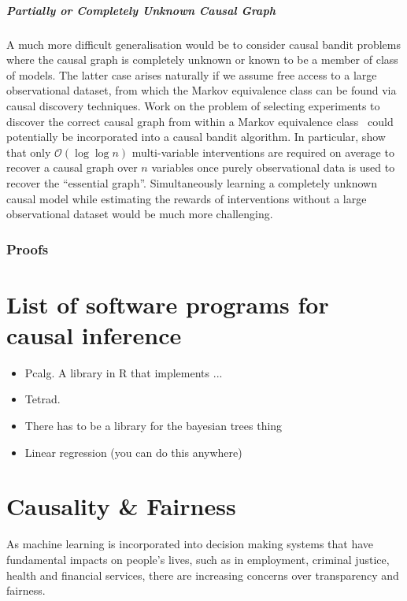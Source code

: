\documentclass[11pt,a4paper,oneside]{book}
\newcommand{\bigo}[1]{\mathcal{O}\left( #1 \right)}
\begin{document}
\paragraph{Partially or Completely Unknown Causal Graph}
A much more difficult generalisation would be to consider causal bandit problems where the causal graph is completely unknown or known to be a member of class of models.
The latter case arises naturally if we assume free access to a large observational dataset, from which the Markov equivalence class can be found via causal discovery techniques. 
Work on the problem of selecting experiments to discover the correct causal graph from within a Markov equivalence class~\cite{Eberhardt2005,eberhardt2010causal,hauser2014two,Hu2014b} could potentially be incorporated into a causal bandit algorithm.
In particular, \citet{Hu2014b} show that only $\bigo{\log \log n}$ multi-variable interventions are required on average to recover a causal graph over $n$ variables once purely observational data is used to recover the ``essential graph''.
Simultaneously learning a completely unknown causal model while estimating the rewards of interventions without a large observational dataset would be much more challenging.

\subsection*{Proofs}

\chapter*{List of software programs for causal inference}

\begin{itemize}
\item Pcalg. A library in R that implements ...
\item Tetrad.
\item There has to be a library for the bayesian trees thing
\item Linear regression (you can do this anywhere)

\end{itemize}

\chapter*{Causality \& Fairness}

As machine learning is incorporated into decision making systems that have fundamental impacts on people’s lives, such as in employment, criminal justice, health and financial services, there are increasing concerns over transparency and fairness. 
\end{document}
